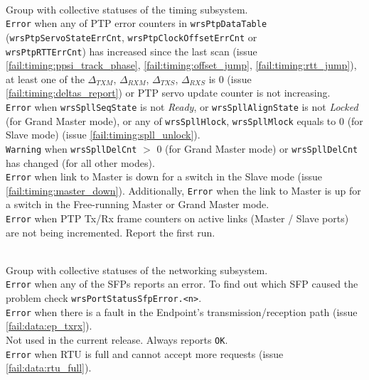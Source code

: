    {\\
    Group with collective statuses of the timing subsystem.}
   {\\
    \texttt{Error} when any of PTP error counters in
    \texttt{wrsPtpDataTable} (\texttt{wrsPtpServoStateErrCnt},
    \texttt{wrsPtpClockOffsetErrCnt} or\\ \texttt{wrsPtpRTTErrCnt}) has
    increased since the last scan (issue
    \ref{fail:timing:ppsi_track_phase}, \ref{fail:timing:offset_jump},
    \ref{fail:timing:rtt_jump}), at least one of the $\Delta_{TXM}$,
    $\Delta_{RXM}$, $\Delta_{TXS}$, $\Delta_{RXS}$ is 0 (issue
    \ref{fail:timing:deltas_report}) or PTP servo update counter is not
    increasing.}
   {\\
    \texttt{Error} when \texttt{wrsSpllSeqState} is not \emph{Ready}, or
    \texttt{wrsSpllAlignState} is not \emph{Locked} (for Grand Master mode), or
    any of \texttt{wrsSpllHlock}, \texttt{wrsSpllMlock} equals to 0 (for Slave
    mode) (issue \ref{fail:timing:spll_unlock}).\\
    \texttt{Warning} when \texttt{wrsSpllDelCnt} $>$ 0 (for Grand Master mode)
    or \texttt{wrsSpllDelCnt} has changed (for all other modes).}
   {\\
    \texttt{Error} when link to Master is down for a switch in the Slave mode
    (issue \ref{fail:timing:master_down}). Additionally, \texttt{Error} when the
    link to Master is up for a switch in the Free-running Master or Grand
    Master mode.}
   {\\
    \texttt{Error} when PTP Tx/Rx frame counters on active links (Master / Slave
    ports) are not being incremented. Report the first run.}
	      
   {\\
    Group with collective statuses of the networking subsystem.}
   {\\
    \texttt{Error} when any of the SFPs reports an error. To find out which SFP
    caused the problem check \texttt{wrsPortStatusSfpError.<n>}.}
   {\\
    \texttt{Error} when there is a fault in the Endpoint's
    transmission/reception path (issue \ref{fail:data:ep_txrx}).}
   {\\
    Not used in the current release. Always reports \texttt{OK}.}
   {\\
    \texttt{Error} when RTU is full and cannot accept more requests (issue
    \ref{fail:data:rtu_full}).}

